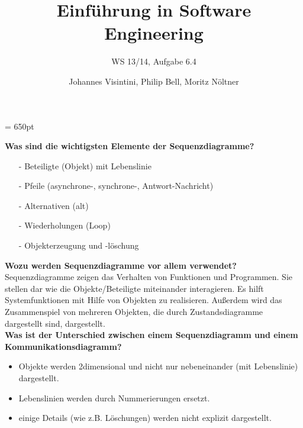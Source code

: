\documentclass[ngerman]{scrartcl}
\begin{document}
\author{Johannes Visintini, Philip Bell, Moritz Nöltner}
\title{Einführung in Software Engineering}
\subtitle{WS 13/14, Aufgabe 6.4}
\maketitle

\textheight = 650pt

\textbf{Was sind die wichtigsten Elemente der Sequenzdiagramme?}
\begin{itemize}
	\item[-] Beteiligte (Objekt) mit Lebenslinie
	\item[-] Pfeile (asynchrone-, synchrone-, Antwort-Nachricht)
	\item[-] Alternativen (alt)
	\item[-] Wiederholungen (Loop)
	\item[-] Objekterzeugung und -löschung
\end{itemize}

\textbf{Wozu werden Sequenzdiagramme vor allem verwendet?}\\
Sequenzdiagramme zeigen das Verhalten von Funktionen und Programmen. Sie
stellen dar wie die Objekte/Beteiligte miteinander interagieren. Es hilft
Systemfunktionen mit Hilfe von Objekten zu realisieren. Außerdem wird das
Zusammenspiel von mehreren Objekten, die durch Zustandsdiagramme dargestellt
sind, dargestellt.\\

\textbf{Was ist der Unterschied zwischen einem Sequenzdiagramm und einem Kommunikationsdiagramm?}
\begin{itemize}
	\item Objekte werden 2dimensional und nicht nur nebeneinander (mit Lebenslinie) dargestellt.
	\item Lebenslinien werden durch Nummerierungen ersetzt.
	\item einige Details (wie z.B. Löschungen) werden nicht explizit dargestellt.
\end{itemize}
\end{document}
